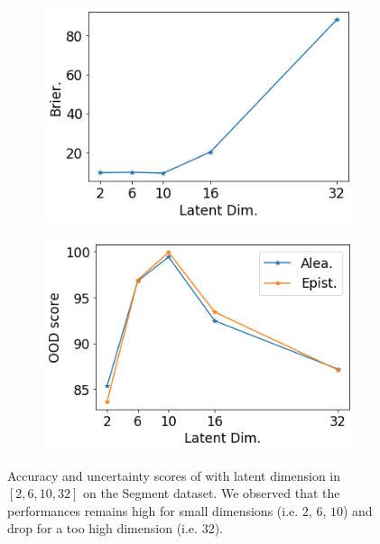 \begin{figure}[ht]
    \begin{subfigure}[t]{0.33 \textwidth}
        \centering
        \includegraphics[width=1. \textwidth]{sections/006_neurips2020/figures/lat_dim_seg_brier.png}
    \end{subfigure}%
    \begin{subfigure}[t]{0.33 \textwidth}
        \centering
        \includegraphics[width=1. \textwidth]{sections/006_neurips2020/figures/lat_dim_seg_ood.png}
    \end{subfigure}%

    \caption{Accuracy and uncertainty scores of \PostNetacro with latent dimension in $[2, 6, 10, 32]$ on the Segment dataset. We observed that the performances remains high for small dimensions (i.e. $2$, $6$, $10$) and drop for a too high dimension (i.e. $32$).}
    \label{fig:latent_dim_segment}
\end{figure}

